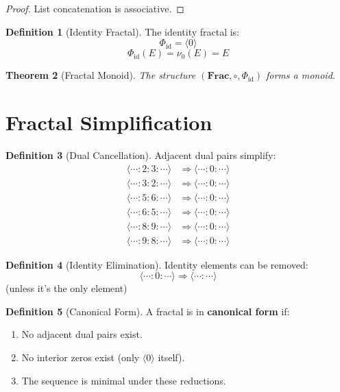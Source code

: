 \documentclass[11pt,twoside,openright]{book}
\theoremstyle{definition}
\newtheorem{definition}{Definition}[chapter]
\theoremstyle{plain}
\newtheorem{theorem}[definition]{Theorem}
\theoremstyle{remark}
\newcommand{\noe}[1]{\nu_{#1}}
\newcommand{\Frac}{\Phi}
\newcommand{\FracSet}{\mathbf{Frac}}
\newcommand{\id}{\mathrm{id}}
\begin{document}
\begin{proof}
List concatenation is associative.
\end{proof}

\begin{definition}[Identity Fractal]
\label{def:id-fractal}
The identity fractal is:
\[
\Frac_{\id} = \langle 0 \rangle
\]
\[
\Frac_{\id}(E) = \noe{0}(E) = E
\]
\end{definition}

\begin{theorem}[Fractal Monoid]
\label{thm:fractal-monoid}
The structure $(\FracSet, \circ, \Frac_{\id})$ forms a monoid.
\end{theorem}

\section{Fractal Simplification}

\begin{definition}[Dual Cancellation]
\label{def:dual-cancel}
Adjacent dual pairs simplify:
\begin{align}
\langle \cdots : 2 : 3 : \cdots \rangle &\Rightarrow \langle \cdots : 0 : \cdots \rangle \\
\langle \cdots : 3 : 2 : \cdots \rangle &\Rightarrow \langle \cdots : 0 : \cdots \rangle \\
\langle \cdots : 5 : 6 : \cdots \rangle &\Rightarrow \langle \cdots : 0 : \cdots \rangle \\
\langle \cdots : 6 : 5 : \cdots \rangle &\Rightarrow \langle \cdots : 0 : \cdots \rangle \\
\langle \cdots : 8 : 9 : \cdots \rangle &\Rightarrow \langle \cdots : 0 : \cdots \rangle \\
\langle \cdots : 9 : 8 : \cdots \rangle &\Rightarrow \langle \cdots : 0 : \cdots \rangle
\end{align}
\end{definition}

\begin{definition}[Identity Elimination]
\label{def:id-elim}
Identity elements can be removed:
\[
\langle \cdots : 0 : \cdots \rangle \Rightarrow \langle \cdots : \cdots \rangle
\]
(unless it's the only element)
\end{definition}

\begin{definition}[Canonical Form]
\label{def:canonical-form}
A fractal is in \textbf{canonical form} if:
\begin{enumerate}
\item No adjacent dual pairs exist.
\item No interior zeros exist (only $\langle 0 \rangle$ itself).
\item The sequence is minimal under these reductions.
\end{enumerate}
\end{definition}
\end{document}

